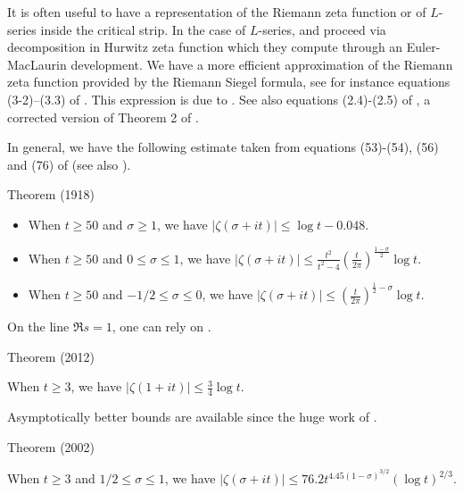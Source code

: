 It is often useful to have a representation of the Riemann zeta function
or of $L$-series inside the critical strip. In the case of $L$-series,
\cite{Spira*69}
and
\cite{Rumely*93}
proceed via decomposition in Hurwitz zeta function which they compute through
an Euler-MacLaurin development. We have a more efficient approximation of the
Riemann zeta function provided by the Riemann Siegel formula, see
for instance equations (3-2)--(3.3)
of \cite{Odlyzko*87}. This
expression is due to 
\cite{Gabcke*79}.
See also 
equations (2.4)-(2.5) of
\cite{Lehman*66}, a corrected
version of Theorem 2 of \cite{Titchmarsh*47}.

\par 
In general, we have the following estimate taken from equations
(53)-(54), (56) and (76)
of  \cite{Backlund*18}
(see also \cite{Backlund*14}).
\par 
\begin{thm}{Theorem (1918)}

  \begin{itemize}
  \item When $t\ge 50$ and $\sigma\ge1$, we have $|\zeta(\sigma+it)|\le \log
  t-0.048$.

  \item  When $t\ge 50$ and $0\le \sigma\le1$, we have $|\zeta(\sigma+it)|\le
  \frac{t^2}{t^2-4}\left(\frac{t}{2\pi}\right)^{\frac{1-\sigma}{2}}\log t$.
  

  \item  When $t\ge 50$ and $-1/2\le \sigma\le0$, we have $|\zeta(\sigma+it)|\le
  \left(\frac{t}{2\pi}\right)^{\frac{1}{2}-\sigma}\log t$.
  

  \end{itemize}
\end{thm}



On the line $\Re s=1$, one can rely on
\cite{Trudgian*12b}.
\par 
\begin{thm}{Theorem (2012)}

  When $t\ge 3$, we have $|\zeta(1+it)|\le\tfrac34 \log t$.
\end{thm}


Asymptotically better bounds are available since the huge work of
\cite{Ford*02}.
\par 
\begin{thm}{Theorem (2002)}

  When $t\ge 3$ and $1/2\le \sigma\le 1$, we have $|\zeta(\sigma+it)|\le 76.2
  t^{4.45(1-\sigma)^{3/2} } (\log t)^{2/3}$.
\end{thm}

